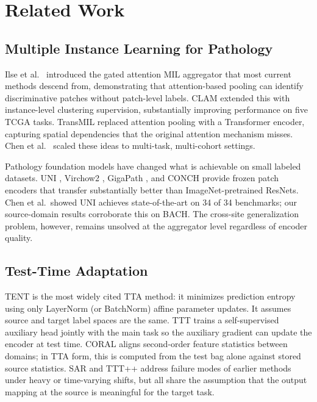 \documentclass[conference]{IEEEtran}
\begin{document}
\section{Related Work}
\label{sec:related}

\subsection{Multiple Instance Learning for Pathology}

Ilse et al.\ \cite{ilse2018attention} introduced the gated attention MIL aggregator that most current methods descend from, demonstrating that attention-based pooling can identify discriminative patches without patch-level labels. CLAM \cite{lu2021data} extended this with instance-level clustering supervision, substantially improving performance on five TCGA tasks. TransMIL \cite{shao2021transmil} replaced attention pooling with a Transformer encoder, capturing spatial dependencies that the original attention mechanism misses. Chen et al.\ \cite{chen2022scaling} scaled these ideas to multi-task, multi-cohort settings.

Pathology foundation models have changed what is achievable on small labeled datasets. UNI \cite{chen2024uni}, Virchow2 \cite{vorontsov2024virchow2}, GigaPath \cite{xu2024gigapath}, and CONCH \cite{lu2023conch} provide frozen patch encoders that transfer substantially better than ImageNet-pretrained ResNets. Chen et al.\ showed UNI achieves state-of-the-art on 34 of 34 benchmarks; our source-domain results corroborate this on BACH. The cross-site generalization problem, however, remains unsolved at the aggregator level regardless of encoder quality.

\subsection{Test-Time Adaptation}

TENT \cite{wang2021tent} is the most widely cited TTA method: it minimizes prediction entropy using only LayerNorm (or BatchNorm) affine parameter updates. It assumes source and target label spaces are the same. TTT \cite{sun2020test} trains a self-supervised auxiliary head jointly with the main task so the auxiliary gradient can update the encoder at test time. CORAL \cite{sun2016coral} aligns second-order feature statistics between domains; in TTA form, this is computed from the test bag alone against stored source statistics. SAR \cite{niu2023towards} and TTT++ \cite{liu2021ttt} address failure modes of earlier methods under heavy or time-varying shifts, but all share the assumption that the output mapping at the source is meaningful for the target task.
\end{document}

